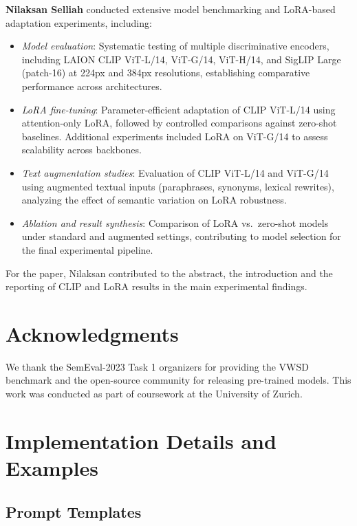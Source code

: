 \documentclass[11pt]{article}
\begin{document}
\textbf{Nilaksan Selliah} conducted extensive model benchmarking and LoRA-based adaptation experiments, including:
\begin{itemize}
    \item \textit{Model evaluation}: Systematic testing of multiple discriminative encoders, including LAION CLIP ViT-L/14, ViT-G/14, ViT-H/14, and SigLIP Large (patch-16) at 224px and 384px resolutions, establishing comparative performance across architectures.
    \item \textit{LoRA fine-tuning}: Parameter-efficient adaptation of CLIP ViT-L/14 using attention-only LoRA, followed by controlled comparisons against zero-shot baselines. Additional experiments included LoRA on ViT-G/14 to assess scalability across backbones.
    \item \textit{Text augmentation studies}: Evaluation of CLIP ViT-L/14 and ViT-G/14 using augmented textual inputs (paraphrases, synonyms, lexical rewrites), analyzing the effect of semantic variation on LoRA robustness.
    \item \textit{Ablation and result synthesis}: Comparison of LoRA vs.\ zero-shot models under standard and augmented settings, contributing to model selection for the final experimental pipeline.
\end{itemize}
For the paper, Nilaksan contributed to the abstract, the introduction and the reporting of CLIP and LoRA results in the main experimental findings.

\section*{Acknowledgments}

We thank the SemEval-2023 Task 1 organizers for providing the VWSD benchmark and the open-source community for releasing pre-trained models. This work was conducted as part of coursework at the University of Zurich.

%


\appendix

\section{Implementation Details and Examples}
\label{sec:appendix}

\subsection{Prompt Templates}
\end{document}
